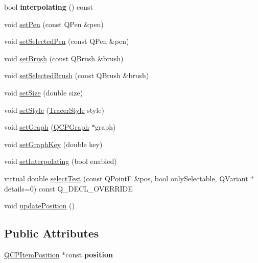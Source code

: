 \begin{DoxyCompactItemize}
bool {\bfseries interpolating} () const
\item 
void \mbox{\hyperlink{class_q_c_p_item_tracer_af8048636fc1ef0152e51809b008df2ca}{set\+Pen}} (const Q\+Pen \&pen)
\item 
void \mbox{\hyperlink{class_q_c_p_item_tracer_ae1bf70db7f13f928660168cd3e5069f3}{set\+Selected\+Pen}} (const Q\+Pen \&pen)
\item 
void \mbox{\hyperlink{class_q_c_p_item_tracer_a2c303f7470a30084daa201ed556b3c36}{set\+Brush}} (const Q\+Brush \&brush)
\item 
void \mbox{\hyperlink{class_q_c_p_item_tracer_a0f55c084980a7a312af859d3e7b558ef}{set\+Selected\+Brush}} (const Q\+Brush \&brush)
\item 
void \mbox{\hyperlink{class_q_c_p_item_tracer_ae47fe0617f5fef5fdb766999569be10a}{set\+Size}} (double size)
\item 
void \mbox{\hyperlink{class_q_c_p_item_tracer_a41a2ac4f1acd7897b4e2a2579c03204e}{set\+Style}} (\mbox{\hyperlink{class_q_c_p_item_tracer_a2f05ddb13978036f902ca3ab47076500}{Tracer\+Style}} style)
\item 
void \mbox{\hyperlink{class_q_c_p_item_tracer_af5886f4ded8dd68cb4f3388f390790c0}{set\+Graph}} (\mbox{\hyperlink{class_q_c_p_graph}{Q\+C\+P\+Graph}} $\ast$graph)
\item 
void \mbox{\hyperlink{class_q_c_p_item_tracer_a6840143b42f3b685cedf7c6d83a704c8}{set\+Graph\+Key}} (double key)
\item 
void \mbox{\hyperlink{class_q_c_p_item_tracer_a6c244a9d1175bef12b50afafd4f5fcd2}{set\+Interpolating}} (bool enabled)
\item 
virtual double \mbox{\hyperlink{class_q_c_p_item_tracer_a9fd955fea40e977d66f3a9fd5765aec4}{select\+Test}} (const Q\+PointF \&pos, bool only\+Selectable, Q\+Variant $\ast$details=0) const Q\+\_\+\+D\+E\+C\+L\+\_\+\+O\+V\+E\+R\+R\+I\+DE
\item 
void \mbox{\hyperlink{class_q_c_p_item_tracer_a5b90296109e36384aedbc8908a670413}{update\+Position}} ()
\end{DoxyCompactItemize}
\subsection*{Public Attributes}
\begin{DoxyCompactItemize}
\item 
\mbox{\label{class_q_c_p_item_tracer_a69917e2fdb2b3a929c196958feee7cbe}} 
\mbox{\hyperlink{class_q_c_p_item_position}{Q\+C\+P\+Item\+Position}} $\ast$const {\bfseries position}
\end{DoxyCompactItemize}
